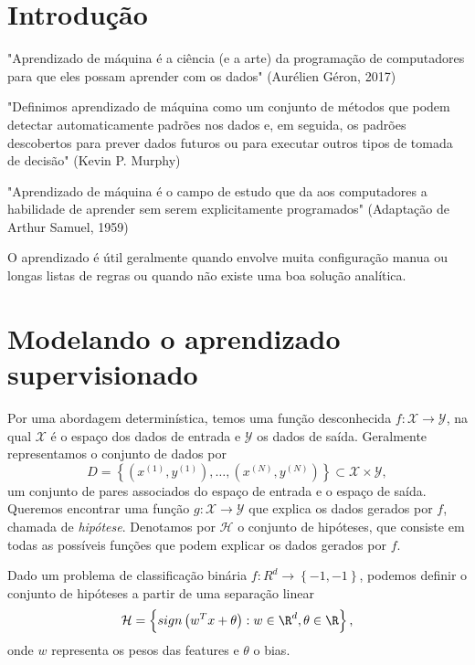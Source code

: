 
\section*{Introdução}

"Aprendizado de máquina é a ciência (e a arte) da programação de computadores para que eles possam aprender com os dados" (Aurélien Géron, 2017)

"Definimos aprendizado de máquina como um conjunto de métodos que podem detectar automaticamente padrões nos dados e, em seguida, os padrões descobertos para prever dados futuros ou para executar outros tipos de tomada de decisão" (Kevin P. Murphy)

"Aprendizado de máquina é o campo de estudo que da aos computadores a habilidade de aprender sem serem explicitamente programados" (Adaptação de Arthur Samuel, 1959)

O aprendizado é útil geralmente quando envolve muita configuração manua ou longas listas de regras ou quando não existe uma boa solução analítica.

\section*{Modelando o aprendizado supervisionado}

Por uma abordagem determinística, temos uma função desconhecida $f:\mathcal{X}\to \mathcal{Y}$, na qual $\mathcal{X}$ é o espaço dos dados de entrada e $\mathcal{Y}$ os dados de saída. Geralmente representamos o conjunto de dados por \[
    D = \left\{ (x^{(1)},y^{(1)}), \ldots, (x^{(N)},y^{(N)}) \right\} \subset  \mathcal{X}\times \mathcal{Y}
,\] um conjunto de pares associados do espaço de entrada e o espaço de saída. Queremos encontrar uma função $g:\mathcal{X}\to \mathcal{Y}$ que explica os dados gerados por $f$, chamada de \emph{hipótese}. Denotamos por $\mathcal{H}$ o conjunto de hipóteses, que consiste em todas as possíveis funções que podem explicar os dados gerados por $f$.

\begin{eg}
    Dado um problema de classificação binária $f:R^{d}\to \left\{  -1,-1 \right\} $, podemos definir o conjunto de hipóteses a partir de uma separação linear \[
	\mathcal{H} = \left\{ sign\left( w^{T}x + \theta \right) : w \in \R^{d}, \theta \in \R \right\} 
    ,\] onde $w$ representa os pesos das features e $\theta$ o bias.
\end{eg}

